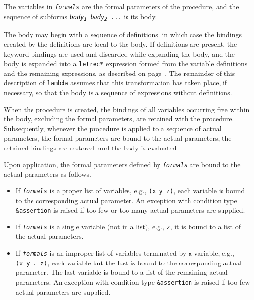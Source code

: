 The variables in \texttt{\textit{formals}} are the \label{binding_s5}formal parameters of the
procedure, and the sequence of subforms
\texttt{\textit{body\textsubscript{1}} \textit{body\textsubscript{2}} ...} is its body.


\label{binding_s6}The body may begin with a sequence of
definitions, in which case the bindings created by the definitions are
local to the body.
If definitions are present, the keyword bindings are used and discarded
while expanding the body, and the body is expanded into a
\texttt{letrec*} expression formed from the variable definitions and the
remaining expressions, as described on page \pageref{syntax_body_expansion}.
The remainder of this description of \texttt{lambda} assumes that this
transformation has taken place, if necessary, so that the body is a
sequence of expressions without definitions.


When the procedure is created, the bindings of all variables occurring
free within the body, excluding the formal parameters, are retained with
the procedure.
Subsequently, whenever the procedure is applied to a sequence of
\label{binding_s7}actual parameters, the formal parameters are bound to the actual
parameters, the retained bindings are restored, and the body is
evaluated.


Upon application, the \label{binding_s8}formal parameters defined by \texttt{\textit{formals}} are
bound to the actual parameters as follows.

\begin{itemize}
\item 
If \texttt{\textit{formals}} is a proper list of variables, e.g., \texttt{(x y z)}, each
variable is bound to the corresponding actual parameter.
An exception with condition type \texttt{\&{}assertion} is raised
if too few or too many actual parameters are supplied.

\item 
If \texttt{\textit{formals}} is a single variable (not in a list), e.g., \texttt{z}, it
is bound to a list of the actual parameters.

\item 
If \texttt{\textit{formals}} is an improper list of variables terminated by a
variable, e.g., \texttt{(x y . z)}, each variable but the last is bound
to the corresponding actual parameter.
The last variable is bound to a list of the remaining actual parameters.
An exception with condition type \texttt{\&{}assertion} is raised
if too few actual parameters are supplied.

\end{itemize}


